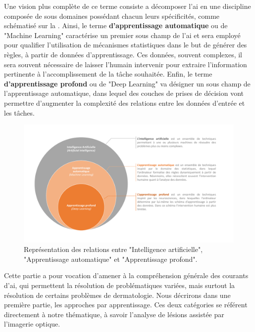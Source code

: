 Une vision plus complète de ce terme consiste a décomposer l'\gls{ai} en une discipline composée de sous domaines possédant chacun leurs spécificités, comme schématisé sur la . Ainsi, le terme \textbf{d'apprentissage automatique} ou de "Machine Learning" caractérise un premier sous champ de l'\gls{ai} et sera employé pour qualifier l'utilisation de mécanismes statistiques dans le but de générer des règles, à partir de données d'apprentissage. Ces données, souvent complexes, il sera souvent nécessaire de laisser l'humain intervenir pour extraire l'information pertinente à l'accomplissement de la tâche souhaitée. Enfin, le terme \textbf{d'apprentissage profond} ou de "Deep Learning" va désigner un sous champ de l'apprentissage automatique, dans lequel des couches de prises de décision vont permettre d'augmenter la complexité des relations entre les données d'entrée et les tâches.\par

\addtocounter{footnote}{1}

\begin{figure}[H]
    \centering
    \includegraphics[width=\linewidth]{contents/chapter_3/resources/scheme_overview_ia.pdf}
    \caption{Représentation des relations entre "Intelligence artificielle", "Apprentissage automatique" et "Apprentissage profond".}
    \label{fig:scheme_overview_ia}
\end{figure}\par

Cette partie a pour vocation d’amener à la compréhension générale des courants d’\gls{ai}, qui permettent la résolution de problématiques variées, mais surtout la résolution de certains problèmes de dermatologie. Nous décrirons dans une première partie, les approches par apprentissage. Ces deux catégories se référent directement à notre thématique, à savoir l’analyse de lésions assistée par l’imagerie optique.\par

